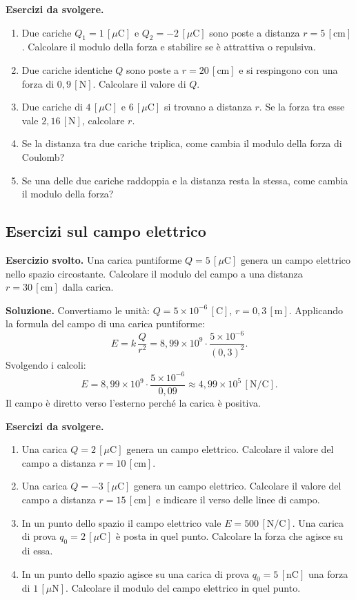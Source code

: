 \textbf{Esercizi da svolgere.}
\begin{enumerate}[leftmargin=1cm]
  \item Due cariche \(Q_1 = 1\,[\mu\text{C}]\) e \(Q_2 = -2\,[\mu\text{C}]\) sono poste a distanza \(r = 5\,[\text{cm}]\). Calcolare il modulo della forza e stabilire se è attrattiva o repulsiva.
  \item Due cariche identiche \(Q\) sono poste a \(r = 20\,[\text{cm}]\) e si respingono con una forza di \(0{,}9\,[\text{N}]\). Calcolare il valore di \(Q\).
  \item Due cariche di \(4\,[\mu\text{C}]\) e \(6\,[\mu\text{C}]\) si trovano a distanza \(r\). Se la forza tra esse vale \(2{,}16\,[\text{N}]\), calcolare \(r\).
  \item Se la distanza tra due cariche triplica, come cambia il modulo della forza di Coulomb?
  \item Se una delle due cariche raddoppia e la distanza resta la stessa, come cambia il modulo della forza?
\end{enumerate}

\subsection{Esercizi sul campo elettrico}

\begin{esercizio}
\textbf{Esercizio svolto.} Una carica puntiforme \(Q = 5\,[\mu\text{C}]\) genera un campo elettrico nello spazio circostante. Calcolare il modulo del campo a una distanza \(r = 30\,[\text{cm}]\) dalla carica.

\smallskip
\textbf{Soluzione.} Convertiamo le unità: \(Q = 5 \times 10^{-6}\,[\text{C}]\), \(r = 0{,}3\,[\text{m}]\). Applicando la formula del campo di una carica puntiforme:
\[
E = k\,\frac{Q}{r^2} = 8{,}99 \times 10^9 \cdot \frac{5 \times 10^{-6}}{(0{,}3)^2}.
\]
Svolgendo i calcoli:
\[
E = 8{,}99 \times 10^9 \cdot \frac{5 \times 10^{-6}}{0{,}09} \approx 4{,}99 \times 10^5\,[\text{N/C}].
\]
Il campo è diretto verso l'esterno perché la carica è positiva.
\end{esercizio}

\textbf{Esercizi da svolgere.}
\begin{enumerate}[leftmargin=1cm]
  \item Una carica \(Q = 2\,[\mu\text{C}]\) genera un campo elettrico. Calcolare il valore del campo a distanza \(r = 10\,[\text{cm}]\).
  \item Una carica \(Q = -3\,[\mu\text{C}]\) genera un campo elettrico. Calcolare il valore del campo a distanza \(r = 15\,[\text{cm}]\) e indicare il verso delle linee di campo.
  \item In un punto dello spazio il campo elettrico vale \(E = 500\,[\text{N/C}]\). Una carica di prova \(q_0 = 2\,[\mu\text{C}]\) è posta in quel punto. Calcolare la forza che agisce su di essa.
  \item In un punto dello spazio agisce su una carica di prova \(q_0 = 5\,[\text{nC}]\) una forza di \(1\,[\mu\text{N}]\). Calcolare il modulo del campo elettrico in quel punto.
\end{enumerate}

